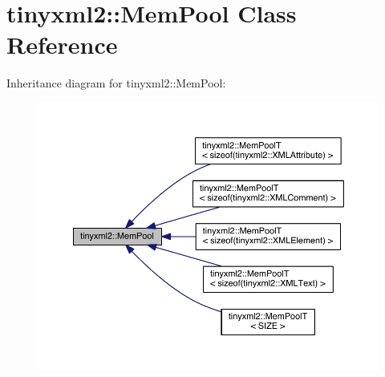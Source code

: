 \hypertarget{classtinyxml2_1_1_mem_pool}{}\section{tinyxml2\+:\+:Mem\+Pool Class Reference}
\label{classtinyxml2_1_1_mem_pool}


Inheritance diagram for tinyxml2\+:\+:Mem\+Pool\+:\nopagebreak
\begin{figure}[H]
\begin{center}
\leavevmode
\includegraphics[width=350pt]{classtinyxml2_1_1_mem_pool__inherit__graph}
\end{center}
\end{figure}
